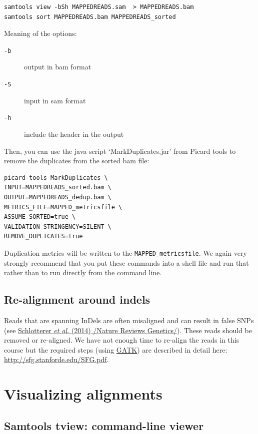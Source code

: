 \documentclass[11pt]{article}
\begin{document}
\begin{verbatim}
samtools view -bSh MAPPEDREADS.sam  > MAPPEDREADS.bam
samtools sort MAPPEDREADS.bam MAPPEDREADS_sorted
\end{verbatim}

Meaning of the options:
\begin{description}
\item[\texttt{-b}] output in bam format
\item[\texttt{-S}] input in sam format
\item[\texttt{-h}] include the header in the output
\end{description}



Then, you can use the java script `MarkDuplicates.jar' from Picard
tools to remove the duplicates from the sorted bam file:


\begin{verbatim}
picard-tools MarkDuplicates \
INPUT=MAPPEDREADS_sorted.bam \
OUTPUT=MAPPEDREADS_dedup.bam \
METRICS_FILE=MAPPED_metricsfile \
ASSUME_SORTED=true \
VALIDATION_STRINGENCY=SILENT \
REMOVE_DUPLICATES=true
\end{verbatim}

Duplication metrics will be written to the \texttt{MAPPED\_metricsfile}. We again
very strongly recommend that you put these commands into a shell file and run
that rather than to run directly from the command line.
\subsection{Re-alignment around indels}
\label{sec-2-2}

Reads that are spanning InDels are often misaligned and can result in
false SNPs (see \href{http://www.nature.com/nrg/journal/v15/n11/full/nrg3803.html}{Schlotterer \emph{et al}. (2014) /Nature Reviews Genetics/}). These reads should be removed or re-aligned. We have not
enough time to re-align the reads in this course but the required
steps (using \href{https://www.broadinstitute.org/gatk/}{GATK}) are described in detail here:
\href{http://sfg.stanforde.edu/SFG.pdf}{http://sfg.stanforde.edu/SFG.pdf}.
\section{Visualizing alignments}
\label{sec-3}
\subsection{Samtools tview: command-line viewer}
\label{sec-3-1}
\end{document}
